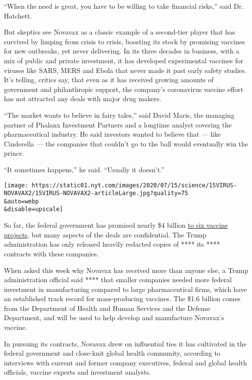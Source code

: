 ``When the need is great, you have to be willing to take financial
risks,'' said Dr. Hatchett.

But skeptics see Novavax as a classic example of a second-tier player
that has survived by limping from crisis to crisis, boosting its stock
by promising vaccines for new outbreaks, yet never delivering. In its
three decades in business, with a mix of public and private investment,
it has developed experimental vaccines for viruses like SARS, MERS and
Ebola that never made it past early safety studies. It's telling,
critics say, that even as it has received growing amounts of government
and philanthropic support, the company's coronavirus vaccine effort has
not attracted any deals with major drug makers.

``The market wants to believe in fairy tales,'' said David Maris, the
managing partner of Phalanx Investment Partners and a longtime analyst
covering the pharmaceutical industry. He said investors wanted to
believe that --- like Cinderella --- the companies that couldn't go to
the ball would eventually win the prince.

``It sometimes happens,'' he said. ``Usually it doesn't.''

\texttt{[image: https://static01.nyt.com/images/2020/07/15/science/15VIRUS-NOVAVAX2/15VIRUS-NOVAVAX2-articleLarge.jpg?quality=75\\\&auto=webp\\\&disable=upscale]}

So far, the federal government has promised nearly \$4 billion
\href{https://medicalcountermeasures.gov/app/barda/coronavirus/COVID19.aspx}{to
six vaccine projects}, but many aspects of the deals are confidential.
The Trump administration has only released heavily redacted copies of
**** its **** contracts with these companies.

When asked this week why Novavax has received more than anyone else, a
Trump administration official said **** that smaller companies needed
more federal investment in manufacturing compared to large
pharmaceutical firms, which have an established track record for
mass-producing vaccines. The \$1.6 billion comes from the Department of
Health and Human Services and the Defense Department, and will be used
to help develop and manufacture Novavax's vaccine.

In pursuing its contracts, Novavax drew on influential ties it has
cultivated in the federal government and close-knit global health
community, according to interviews with current and former company
executives, federal and global health officials, vaccine experts and
investment analysts.

